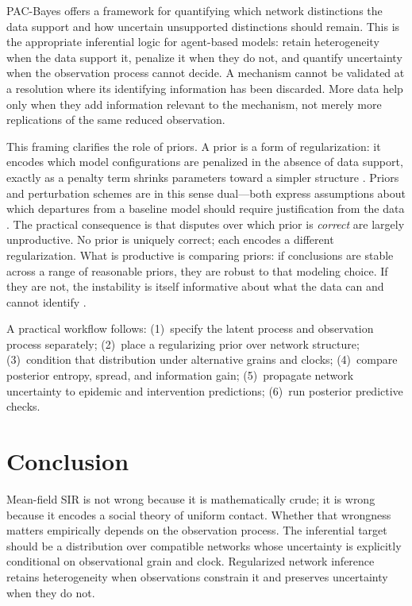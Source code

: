 \documentclass[11pt]{article}
\begin{document}
PAC-Bayes offers a framework for quantifying which network distinctions the data
support and how uncertain unsupported distinctions should remain. This is the
appropriate inferential logic for
agent-based models: retain heterogeneity when the data support it, penalize it
when they do not, and quantify uncertainty when the observation process cannot
decide. A mechanism cannot be validated at a resolution where its identifying
information has been discarded. More data help only when they add information
relevant to the mechanism, not merely more replications of the same reduced
observation.

This framing clarifies the role of priors. A prior is a form of regularization:
it encodes which model configurations are penalized in the absence of data support,
exactly as a penalty term shrinks parameters toward a simpler structure
\citep{tibshirani1996}. Priors and perturbation schemes are in this sense
dual---both express assumptions about which departures from a baseline model should
require justification from the data \citep{hazan2016}.
The practical consequence is that disputes over which prior is \emph{correct} are
largely unproductive. No prior is uniquely correct; each encodes a different
regularization. What is productive is comparing priors: if conclusions are stable
across a range of reasonable priors, they are robust to that modeling choice. If
they are not, the instability is itself informative about what the data can and
cannot identify \citep{gelman2013}.

A practical workflow follows: (1)~specify the latent process and observation
process separately; (2)~place a regularizing prior over network structure;
(3)~condition that distribution under alternative grains and clocks; (4)~compare
posterior entropy, spread, and information gain; (5)~propagate network uncertainty
to epidemic and intervention predictions; (6)~run posterior predictive checks.

\section{Conclusion}

Mean-field SIR is not wrong because it is mathematically crude; it is wrong because
it encodes a social theory of uniform contact. Whether that wrongness matters
empirically depends on the observation process. The inferential target should be a
distribution over compatible networks whose uncertainty is explicitly conditional
on observational grain and clock. Regularized network inference retains
heterogeneity when observations constrain it and preserves uncertainty when they do
not.
\end{document}
